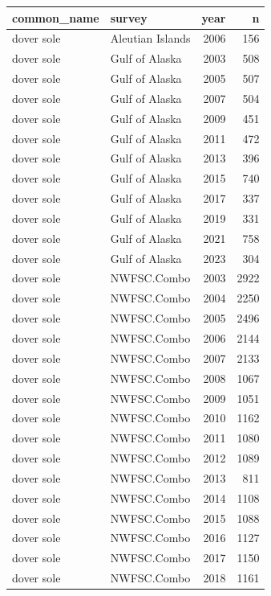 \documentclass[
  letterpaper,
  DIV=11,
  numbers=noendperiod]{scrartcl}
\begin{document}
\begin{tabular}[t]{l|l|r|r}
\hline
common\_name & survey & year & n\\
\hline
dover sole & Aleutian Islands & 2006 & 156\\
\hline
dover sole & Gulf of Alaska & 2003 & 508\\
\hline
dover sole & Gulf of Alaska & 2005 & 507\\
\hline
dover sole & Gulf of Alaska & 2007 & 504\\
\hline
dover sole & Gulf of Alaska & 2009 & 451\\
\hline
dover sole & Gulf of Alaska & 2011 & 472\\
\hline
dover sole & Gulf of Alaska & 2013 & 396\\
\hline
dover sole & Gulf of Alaska & 2015 & 740\\
\hline
dover sole & Gulf of Alaska & 2017 & 337\\
\hline
dover sole & Gulf of Alaska & 2019 & 331\\
\hline
dover sole & Gulf of Alaska & 2021 & 758\\
\hline
dover sole & Gulf of Alaska & 2023 & 304\\
\hline
dover sole & NWFSC.Combo & 2003 & 2922\\
\hline
dover sole & NWFSC.Combo & 2004 & 2250\\
\hline
dover sole & NWFSC.Combo & 2005 & 2496\\
\hline
dover sole & NWFSC.Combo & 2006 & 2144\\
\hline
dover sole & NWFSC.Combo & 2007 & 2133\\
\hline
dover sole & NWFSC.Combo & 2008 & 1067\\
\hline
dover sole & NWFSC.Combo & 2009 & 1051\\
\hline
dover sole & NWFSC.Combo & 2010 & 1162\\
\hline
dover sole & NWFSC.Combo & 2011 & 1080\\
\hline
dover sole & NWFSC.Combo & 2012 & 1089\\
\hline
dover sole & NWFSC.Combo & 2013 & 811\\
\hline
dover sole & NWFSC.Combo & 2014 & 1108\\
\hline
dover sole & NWFSC.Combo & 2015 & 1088\\
\hline
dover sole & NWFSC.Combo & 2016 & 1127\\
\hline
dover sole & NWFSC.Combo & 2017 & 1150\\
\hline
dover sole & NWFSC.Combo & 2018 & 1161\\

\end{tabular}
\end{document}
